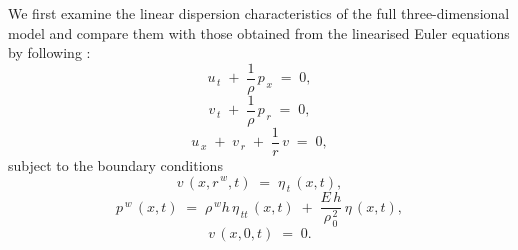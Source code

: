 \documentclass[alpha-refs, 12pt]{wiley-article}
\begin{document}
We first examine the linear dispersion characteristics of the full three-dimensional model and compare them with those obtained from the linearised Euler equations by following \citep{Mitsotakis2018}:
\begin{equation}\label{eq:lin_u}
  u_{\,t}\;+\;\frac{1}{\rho}\,p_{\,x}\;=\;0,
\end{equation}
\begin{equation}\label{eq:lin_v}
  v_{\,t}\;+\;\frac{1}{\rho}\,p_{\,r}\;=\;0,
\end{equation}
\begin{equation}\label{eq:lin_cont}
  u_{\,x}\;+\;v_{\,r}\;+\;\frac{1}{r}\,v\;=\;0,
\end{equation}
subject to the boundary conditions
\begin{equation}\label{eq:lin_bc_kin}
  v\,\left(x,r^{\,w},t\right)\;=\;\eta_{\,t}\,\left(x,t\right), 
\end{equation}
\begin{equation}\label{eq:lin_bc_dyn}
  p^{\,w}\,\left(x,t\right)\; = \;\rho^{\,w}h\,\eta_{\,tt}\,\left(x,t\right)\; + \;\frac{E\,h}{\rho_{\,0}^{\,2}}\,
  \eta\,\left(x,t\right),
\end{equation}
\begin{equation}\label{eq:lin_bc_axis}
  v\,\left(x,0,t\right)\; = \;0.
\end{equation}
\end{document}
